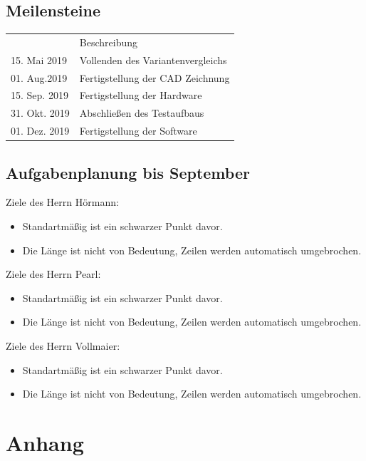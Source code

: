 \section{Meilensteine}
\begin{table}[h!]
    \begin{tabular}{ll}
        \hline
        \rowcolor[HTML]{C0C0C0}
        \multicolumn{2}{c}{\cellcolor[HTML]{C0C0C0}\textbf{Meilensteine}}                      \\ \hline
        \rowcolor[HTML]{EFEFEF}
        \multicolumn{1}{l|}{\cellcolor[HTML]{EFEFEF}Datum} & Beschreibung                      \\ \hline
        \multicolumn{1}{l|}{15. Mai 2019}                   & Vollenden des Variantenvergleichs \\ \hline
        \multicolumn{1}{l|}{01. Aug.2019}                    & Fertigstellung der CAD Zeichnung  \\ \hline
        \multicolumn{1}{l|}{15. Sep. 2019}                   & Fertigstellung der Hardware       \\ \hline
        \multicolumn{1}{l|}{31. Okt. 2019}                   & Abschließen des Testaufbaus       \\ \hline
        \multicolumn{1}{l|}{01. Dez. 2019}                    & Fertigstellung der Software       \\ \hline
    \end{tabular}
\end{table}

\section{Aufgabenplanung bis September}

Ziele des Herrn Hörmann:
\begin{itemize}
    \item Standartmäßig ist ein schwarzer Punkt davor.
    \item Die Länge ist nicht von Bedeutung, Zeilen werden automatisch umgebrochen.
\end{itemize}

\noindent\hrulefill

Ziele des Herrn Pearl:
\begin{itemize}
    \item Standartmäßig ist ein schwarzer Punkt davor.
    \item Die Länge ist nicht von Bedeutung, Zeilen werden automatisch umgebrochen.
\end{itemize}

\noindent\hrulefill

Ziele des Herrn Vollmaier:
\begin{itemize}
    \item Standartmäßig ist ein schwarzer Punkt davor.
    \item Die Länge ist nicht von Bedeutung, Zeilen werden automatisch umgebrochen.
\end{itemize}

\chapter{Anhang}




